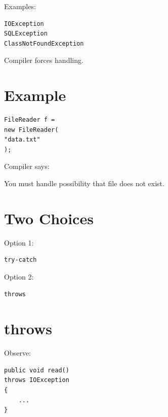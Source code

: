 \documentclass[11pt,a4paper]{book}
\begin{document}
Examples:

\begin{verbatim} 
IOException
SQLException
ClassNotFoundException
\end{verbatim}


Compiler forces handling.


\section{Example}

\begin{verbatim} 
FileReader f =
new FileReader(
"data.txt"
);
\end{verbatim}


Compiler says:


You must handle possibility
that file does not exist.


\section{Two Choices}

Option 1:

\begin{verbatim} 
try-catch
\end{verbatim}


Option 2:

\begin{verbatim} 
throws
\end{verbatim}


\section{throws}

Observe:

\begin{verbatim} 
public void read()
throws IOException
{
    ...
}
\end{verbatim}
\end{document}
